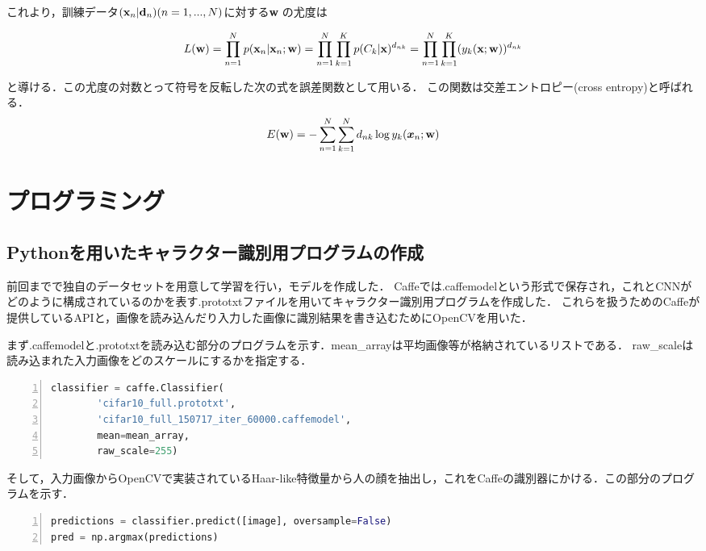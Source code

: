 \documentclass[a4paper,10pt]{jsarticle}
\def\vec#1{\mbox{\boldmath$#1$}}
\begin{document}
これより，訓練データ${({\bf x}_n|{\bf d}_n)}(n=1,...,N)$に対する{\bf w}
の尤度は

\begin{equation}
 L({\bf w})=\prod_{n=1}^{N}p({\bf x}_n|{\bf x}_n;{\bf
	w})=\prod_{n=1}^{N}\prod_{k=1}^{K}p(C_k|{\bf
	x})^{d_{nk}}=\prod_{n=1}^{N}\prod_{k=1}^{K}(y_k({\bf x};{\bf w}))^{d_{nk}}
\end{equation}

と導ける．この尤度の対数とって符号を反転した次の式を誤差関数として用いる．
この関数は交差エントロピー(cross entropy)と呼ばれる．
\begin{eqnarray}
 E({\bf w})=-\sum^{N}_{n=1}\sum^{N}_{k=1}d_{nk}\log
	y_{k}(\vec{x}_{n};{\bf w})
\end{eqnarray}


\section{プログラミング}
\subsection{Pythonを用いたキャラクター識別用プログラムの作成}
前回までで独自のデータセットを用意して学習を行い，モデルを作成した．
Caffeでは.caffemodelという形式で保存され，これとCNNがどのように構成されているのかを表す.prototxtファイルを用いてキャラクター識別用プログラムを作成した．
これらを扱うためのCaffeが提供しているAPIと，画像を読み込んだり入力した画像に識別結果を書き込むためにOpenCVを用いた．

まず.caffemodelと.prototxtを読み込む部分のプログラムを示す．mean\_arrayは平均画像等が格納されているリストである．
raw\_scaleは読み込まれた入力画像をどのスケールにするかを指定する．

\begin{lstlisting}[basicstyle=\ttfamily\footnotesize, language=Python, frame=single, firstnumber=1, numbers=left, breaklines=true]
classifier = caffe.Classifier(
        'cifar10_full.prototxt',
        'cifar10_full_150717_iter_60000.caffemodel',
        mean=mean_array,
        raw_scale=255)
\end{lstlisting}

そして，入力画像からOpenCVで実装されているHaar-like特徴量から人の顔を抽出し，これをCaffeの識別器にかける．この部分のプログラムを示す．

\begin{lstlisting}[basicstyle=\ttfamily\footnotesize, language=Python, frame=single, firstnumber=1, numbers=left, breaklines=true]
predictions = classifier.predict([image], oversample=False)
pred = np.argmax(predictions)
\end{lstlisting}
\end{document}
